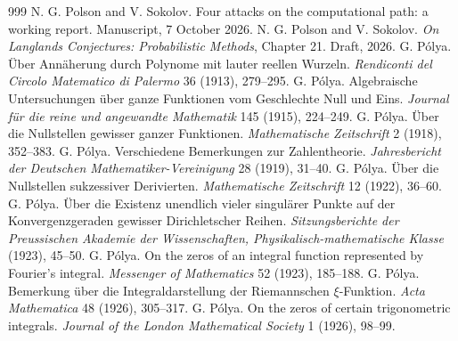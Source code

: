 \begin{thebibliography}{999}
 N. G. Polson and V. Sokolov. Four attacks on the computational path: a working report. Manuscript, 7 October 2026.
 N. G. Polson and V. Sokolov. \emph{On Langlands Conjectures: Probabilistic Methods}, Chapter 21. Draft, 2026.
 G. P\'olya. \"Uber Ann\"aherung durch Polynome mit lauter reellen Wurzeln. \emph{Rendiconti del Circolo Matematico di Palermo} 36 (1913), 279--295.
 G. P\'olya. Algebraische Untersuchungen \"uber ganze Funktionen vom Geschlechte Null und Eins. \emph{Journal f\"ur die reine und angewandte Mathematik} 145 (1915), 224--249.
 G. P\'olya. \"Uber die Nullstellen gewisser ganzer Funktionen. \emph{Mathematische Zeitschrift} 2 (1918), 352--383.
 G. P\'olya. Verschiedene Bemerkungen zur Zahlentheorie. \emph{Jahresbericht der Deutschen Mathematiker-Vereinigung} 28 (1919), 31--40.
 G. P\'olya. \"Uber die Nullstellen sukzessiver Derivierten. \emph{Mathematische Zeitschrift} 12 (1922), 36--60.
 G. P\'olya. \"Uber die Existenz unendlich vieler singul\"arer Punkte auf der Konvergenzgeraden gewisser Dirichletscher Reihen. \emph{Sitzungsberichte der Preussischen Akademie der Wissenschaften, Physikalisch-mathematische Klasse} (1923), 45--50.
 G. P\'olya. On the zeros of an integral function represented by Fourier's integral. \emph{Messenger of Mathematics} 52 (1923), 185--188.
 G. P\'olya. Bemerkung \"uber die Integraldarstellung der Riemannschen $\xi$-Funktion. \emph{Acta Mathematica} 48 (1926), 305--317.
 G. P\'olya. On the zeros of certain trigonometric integrals. \emph{Journal of the London Mathematical Society} 1 (1926), 98--99.

\end{thebibliography}
